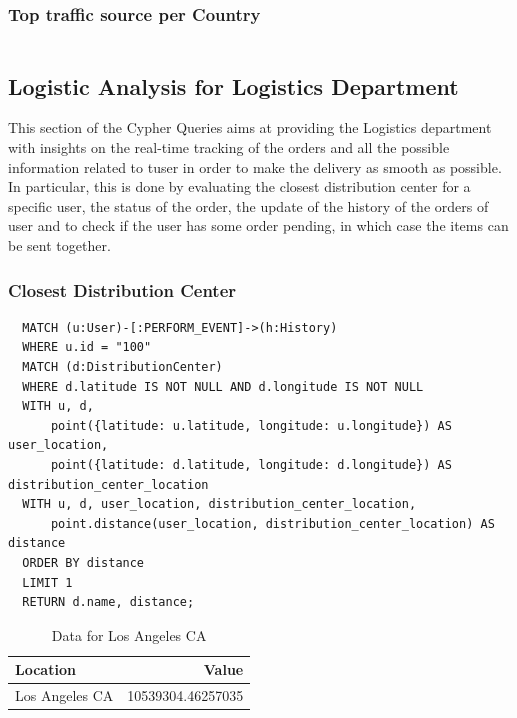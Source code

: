 \documentclass[a4paper,12pt]{article}
\begin{document}
  \subsubsection{Top traffic source per Country}
  \begin{verbatim}

  \end{verbatim}  

\subsection{Logistic Analysis for Logistics Department}
This section of the Cypher Queries aims at providing the Logistics department with insights on the real-time tracking of the orders and all the possible information related to tuser in order to make the delivery as smooth as possible.
In particular, this is done by evaluating the closest distribution center for a specific user, the status of the order, the update of the history of the orders of user and to check if the user has some order pending, in which case the items can be sent together. 

\subsubsection{Closest Distribution Center}
\begin{verbatim}
  MATCH (u:User)-[:PERFORM_EVENT]->(h:History)
  WHERE u.id = "100"
  MATCH (d:DistributionCenter)
  WHERE d.latitude IS NOT NULL AND d.longitude IS NOT NULL
  WITH u, d, 
      point({latitude: u.latitude, longitude: u.longitude}) AS user_location, 
      point({latitude: d.latitude, longitude: d.longitude}) AS distribution_center_location
  WITH u, d, user_location, distribution_center_location, 
      point.distance(user_location, distribution_center_location) AS distance
  ORDER BY distance
  LIMIT 1
  RETURN d.name, distance;
\end{verbatim}

\begin{table}[h!]
  \centering
  \caption{Data for Los Angeles CA}
  \label{tab:los_angeles_data}
  \begin{tabular}{l r}
      \toprule
      \textbf{Location} & \textbf{Value} \\
      \midrule
      Los Angeles CA & 10539304.46257035 \\
      \bottomrule
  \end{tabular}
\end{table}
\end{document}
